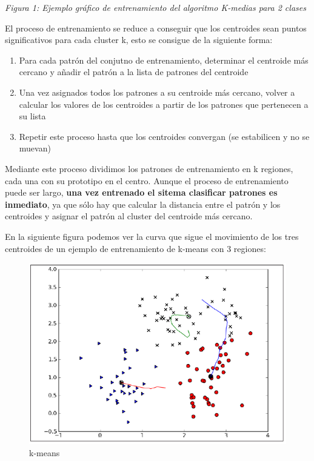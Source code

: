 \documentclass[11pt]{article}
\makeatletter
\def\maxwidth{\ifdim\Gin@nat@width>\linewidth\linewidth
    \else\Gin@nat@width\fi}
\let\Oldincludegraphics\includegraphics
\renewcommand{\includegraphics}[1]{\Oldincludegraphics[width=.8\maxwidth]{#1}}
\providecommand{\tightlist}{%
      \setlength{\itemsep}{0pt}\setlength{\parskip}{0pt}}
\makeatother
\begin{document}
\emph{Figura 1: Ejemplo gráfico de entrenamiento del algoritmo K-medias
para 2 clases}

El proceso de entrenamiento se reduce a conseguir que los centroides
sean puntos significativos para cada cluster k, esto se consigue de la
siguiente forma:

\begin{enumerate}
\def\labelenumi{\arabic{enumi}.}
\tightlist
\item
  Para cada patrón del conjutno de entrenamiento, determinar el
  centroide más cercano y añadir el patrón a la lista de patrones del
  centroide
\item
  Una vez asignados todos los patrones a su centroide más cercano,
  volver a calcular los valores de los centroides a partir de los
  patrones que pertenecen a su lista
\item
  Repetir este proceso hasta que los centroides convergan (se
  estabilicen y no se muevan)
\end{enumerate}

Mediante este proceso dividimos los patrones de entrenamiento en k
regiones, cada una con su prototipo en el centro. Aunque el proceso de
entrenamiento puede ser largo, \textbf{una vez entrenado el sitema
clasificar patrones es inmediato}, ya que sólo hay que calcular la
distancia entre el patrón y los centroides y asignar el patrón al
cluster del centroide más cercano.

En la siguiente figura podemos ver la curva que sigue el movimiento de
los tres centroides de un ejemplo de entrenamiento de k-means con 3
regiones:

\begin{figure}
\centering
\includegraphics{image-4.png}
\caption{k-means}
\end{figure}
\end{document}
